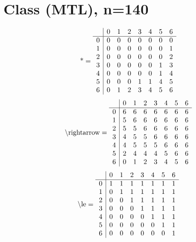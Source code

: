 \documentclass[11pt]{article}
\begin{document}
\section{Class (MTL), n=140}
\[\text{*} = 
\begin{array}{r | r r r r r r r}
 & 0 & 1 & 2 & 3 & 4 & 5 & 6 \\ \hline
0 & 0 & 0 & 0 & 0 & 0 & 0 & 0 \\
1 & 0 & 0 & 0 & 0 & 0 & 0 & 1 \\
2 & 0 & 0 & 0 & 0 & 0 & 0 & 2 \\
3 & 0 & 0 & 0 & 0 & 0 & 1 & 3 \\
4 & 0 & 0 & 0 & 0 & 0 & 1 & 4 \\
5 & 0 & 0 & 0 & 1 & 1 & 4 & 5 \\
6 & 0 & 1 & 2 & 3 & 4 & 5 & 6 \\
\end{array}
\]
\[\text{\textbackslash rightarrow} = 
\begin{array}{r | r r r r r r r}
 & 0 & 1 & 2 & 3 & 4 & 5 & 6 \\ \hline
0 & 6 & 6 & 6 & 6 & 6 & 6 & 6 \\
1 & 5 & 6 & 6 & 6 & 6 & 6 & 6 \\
2 & 5 & 5 & 6 & 6 & 6 & 6 & 6 \\
3 & 4 & 5 & 5 & 6 & 6 & 6 & 6 \\
4 & 4 & 5 & 5 & 5 & 6 & 6 & 6 \\
5 & 2 & 4 & 4 & 4 & 5 & 6 & 6 \\
6 & 0 & 1 & 2 & 3 & 4 & 5 & 6 \\
\end{array}
\]
\[\text{\textbackslash le} = 
\begin{array}{r | r r r r r r r}
 & 0 & 1 & 2 & 3 & 4 & 5 & 6 \\ \hline
0 & 1 & 1 & 1 & 1 & 1 & 1 & 1 \\
1 & 0 & 1 & 1 & 1 & 1 & 1 & 1 \\
2 & 0 & 0 & 1 & 1 & 1 & 1 & 1 \\
3 & 0 & 0 & 0 & 1 & 1 & 1 & 1 \\
4 & 0 & 0 & 0 & 0 & 1 & 1 & 1 \\
5 & 0 & 0 & 0 & 0 & 0 & 1 & 1 \\
6 & 0 & 0 & 0 & 0 & 0 & 0 & 1 \\
\end{array}
\]
\end{document}
